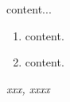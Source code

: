 \newpage
\vspace{-2.5cm}
\chapter*{}

\vspace{-0.5cm}


\setlength{\baselineskip}{17pt}
content...




\begin{enumerate}[~(1)]
	\item {}content.
	
	\item {} content.
	
\end{enumerate} 



{} \textit{xxx, xxxx}


{}